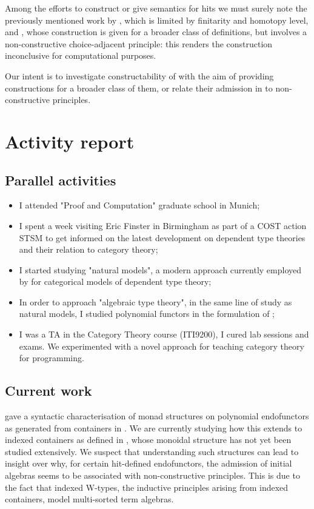 \documentclass[a4paper]{article}
\begin{document}
Among the efforts to construct or give semantics for \glspl{hit} we must surely note the previously mentioned work by \textcite{Weide2019}, which is limited by finitarity and homotopy level, and \textcite{Fiore2022}, whose construction is given for a broader class of definitions, but involves a non-constructive choice-adjacent principle: this renders the construction inconclusive for computational purposes.

Our intent is to investigate constructability of  with the aim of providing constructions for a broader class of them, or relate their admission in  to non-constructive principles.

\section{Activity report}

\subsection{Parallel activities}

\begin{itemize}
	\item I attended "Proof and Computation" graduate school in Munich;
	\item I spent a week visiting Eric Finster in Birmingham as part of a COST action STSM to get informed on the latest development on dependent type theories and their relation to category theory;
	\item I started studying "natural models", a modern approach currently employed by \textcite{Awodey2016} for categorical models of dependent type theory;
	\item In order to approach "algebraic type theory", in the same line of study as natural models, I studied polynomial functors in the formulation of \textcite{Gambino2009};
	\item I was a TA in the Category Theory course (ITI9200), I cured lab sessions and exams. We experimented with a novel approach for teaching category theory for programming.
\end{itemize}

\subsection{Current work}

\textcite{Uustalu2017} gave a syntactic characterisation of monad structures on polynomial endofunctors as generated from containers in \cite{Abbott2005}. We are currently studying how this extends to indexed containers as defined in \cite{Altenkirch2015}, whose monoidal structure has not yet been studied extensively. We suspect that understanding such structures can lead to insight over why, for certain \gls{hit}-defined endofunctors, the admission of initial algebras seems to be associated with non-constructive principles. This is due to the fact that indexed W-types, the inductive principles arising from indexed containers, model multi-sorted term algebras.
\end{document}
